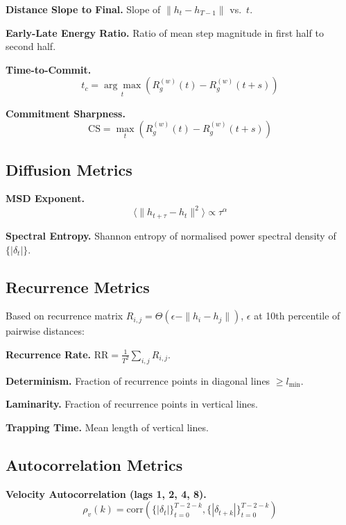 \documentclass[11pt,twocolumn]{article}
\begin{document}
\textbf{Distance Slope to Final.} Slope of $\|h_t - h_{T-1}\|$ vs.\ $t$.

\textbf{Early-Late Energy Ratio.} Ratio of mean step magnitude in first half to second half.

\textbf{Time-to-Commit.}
\begin{equation}
t_c = \underset{t}{\arg\max}\left(R_g^{(w)}(t) - R_g^{(w)}(t + s)\right)
\end{equation}

\textbf{Commitment Sharpness.}
\begin{equation}
\text{CS} = \max_t \left(R_g^{(w)}(t) - R_g^{(w)}(t+s)\right)
\end{equation}

\subsection{Diffusion Metrics}

\textbf{MSD Exponent.}
\begin{equation}
\langle\|h_{t+\tau} - h_t\|^2\rangle \propto \tau^\alpha
\end{equation}

\textbf{Spectral Entropy.} Shannon entropy of normalised power spectral density of $\{|\delta_t|\}$.

\subsection{Recurrence Metrics}

Based on recurrence matrix $R_{i,j} = \Theta(\epsilon - \|h_i - h_j\|)$, $\epsilon$ at 10th percentile of pairwise distances:

\textbf{Recurrence Rate.} $\text{RR} = \frac{1}{T^2}\sum_{i,j} R_{i,j}$.

\textbf{Determinism.} Fraction of recurrence points in diagonal lines $\geq l_{\min}$.

\textbf{Laminarity.} Fraction of recurrence points in vertical lines.

\textbf{Trapping Time.} Mean length of vertical lines.

\subsection{Autocorrelation Metrics}

\textbf{Velocity Autocorrelation (lags 1, 2, 4, 8).}
\begin{equation}
\rho_v(k) = \text{corr}\left(\{|\delta_t|\}_{t=0}^{T-2-k}, \{|\delta_{t+k}|\}_{t=0}^{T-2-k}\right)
\end{equation}
\end{document}
